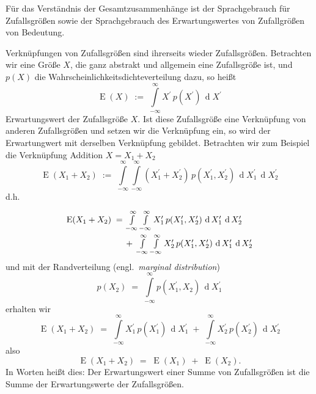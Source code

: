 Für das Verständnis der Gesamtzusammenhänge ist der Sprachgebrauch für Zufallsgrößen sowie
der Sprachgebrauch des Erwartungswertes von Zufallgrößen von Bedeutung. 

Verknüpfungen von Zufallsgrößen sind ihrerseits wieder Zufallsgrößen. Betrachten
wir eine Größe $X$, die ganz abstrakt und allgemein eine Zufallsgröße ist, und
$p(X)$ die Wahrscheinlichkeitsdichteverteilung dazu, so heißt
\begin{equation}
\operatorname{E}(X) \; := \;  \int\limits_{-\infty}^{\infty}
X^\prime \, p(X^\prime) \, \operatorname{d} X^\prime
\end{equation}
Erwartungswert der Zufallsgröße $X$.
Ist diese Zufallsgröße eine Verknüpfung von anderen Zufallsgrößen und setzen wir die
Verknüpfung ein, so wird der Erwartungwert mit derselben Verknüpfung gebildet.
Betrachten wir zum Beispiel die Verknüpfung Addition $X = X_1 + X_2$
\begin{equation}
\operatorname{E}(X_1 + X_2) \; := \;  \int\limits_{-\infty}^{\infty} \int\limits_{-\infty}^{\infty}
(X_1^\prime + X_2^\prime) \, p(X_1^\prime, X_2^\prime) \, \operatorname{d} X_1^\prime \, \operatorname{d} X_2^\prime
\end{equation}
d.h.
\begin{equation}
\arraycolsep=2.0pt\def\arraystretch{2.0}
\begin{array}{ll}
\operatorname{E}(X_1 + X_2) \; = & \int\limits_{-\infty}^{\infty} \int\limits_{-\infty}^{\infty}
X_1^\prime \, p(X_1^\prime, X_2^\prime) \, 
\operatorname{d} X_1^\prime \, \operatorname{d} X_2^\prime\\
& + \; \int\limits_{-\infty}^{\infty} \int\limits_{-\infty}^{\infty} 
X_2^\prime \, p(X_1^\prime, X_2^\prime) \, \operatorname{d} X_1^\prime \, \operatorname{d} X_2^\prime
\end{array}
\end{equation}
und mit der Randverteilung (engl.\ \textsl{marginal distribution}) 
\begin{equation}
p(X_2) \; = \;
\int\limits_{-\infty}^{\infty} p(X_1^\prime, X_2) \, \operatorname{d} X_1^\prime
\label{marginalDistr}
\end{equation}
erhalten wir
\begin{equation}
\operatorname{E}(X_1 + X_2) \; = \; \int\limits_{-\infty}^{\infty}
X_1^\prime \, p(X_1^\prime) \, \operatorname{d} X_1^\prime 
\; + \; \int\limits_{-\infty}^{\infty} 
X_2^\prime \, p(X_2^\prime) \, \operatorname{d} X_2^\prime
\end{equation}
also
\begin{equation}
\operatorname{E}(X_1 + X_2) \; = \; \operatorname{E}(X_1) \; + \; \operatorname{E}(X_2).
\label{EwSummeISTSummeEw}
\end{equation}
In Worten heißt dies: Der Erwartungswert einer Summe von Zufallsgrößen ist die
Summe der Erwartungswerte der Zufallsgrößen.

